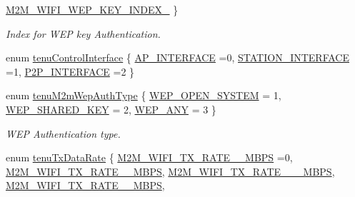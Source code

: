 \begin{DoxyCompactItemize}
\hyperlink{group__WlanEnums_gga43e100b0ae55a0b7000e5eaeaac24b8da59eea9302324b933e56fe7f408b89958}{M2\+M\+\_\+\+W\+I\+F\+I\+\_\+\+W\+E\+P\+\_\+\+K\+E\+Y\+\_\+\+I\+N\+D\+E\+X\+\_}
 \}\begin{DoxyCompactList}\small\item\em Index for W\+EP key Authentication. \end{DoxyCompactList}
\item 
enum \hyperlink{group__WlanEnums_ga21dc8518e48f99cdf9cf68eebcfcf982}{tenu\+Control\+Interface} \{ \hyperlink{group__WlanEnums_gga21dc8518e48f99cdf9cf68eebcfcf982aeef78d0be1ab7a519e48d25a2eea8717}{A\+P\+\_\+\+I\+N\+T\+E\+R\+F\+A\+CE} =0, 
\hyperlink{group__WlanEnums_gga21dc8518e48f99cdf9cf68eebcfcf982af1332c69b03c8077d76b6652e4b6b67d}{S\+T\+A\+T\+I\+O\+N\+\_\+\+I\+N\+T\+E\+R\+F\+A\+CE} =1, 
\hyperlink{group__WlanEnums_gga21dc8518e48f99cdf9cf68eebcfcf982a3a2237e45eb871715b30ac94c105b4a2}{P2\+P\+\_\+\+I\+N\+T\+E\+R\+F\+A\+CE} =2
 \}
\item 
enum \hyperlink{group__WlanEnums_gadb7d333125e6dcd9bf5e1c47f7d85c42}{tenu\+M2m\+Wep\+Auth\+Type} \{ \hyperlink{group__WlanEnums_ggadb7d333125e6dcd9bf5e1c47f7d85c42a486491e09ad6e120b316d488dbeadc76}{W\+E\+P\+\_\+\+O\+P\+E\+N\+\_\+\+S\+Y\+S\+T\+EM} = 1, 
\hyperlink{group__WlanEnums_ggadb7d333125e6dcd9bf5e1c47f7d85c42a499409188630862aa172dc8afab93606}{W\+E\+P\+\_\+\+S\+H\+A\+R\+E\+D\+\_\+\+K\+EY} = 2, 
\hyperlink{group__WlanEnums_ggadb7d333125e6dcd9bf5e1c47f7d85c42a604c4b6344620950733514c797ce4800}{W\+E\+P\+\_\+\+A\+NY} = 3
 \}\begin{DoxyCompactList}\small\item\em W\+EP Authentication type. \end{DoxyCompactList}
\item 
enum \hyperlink{group__WlanEnums_ga93cc7cca5e41a62c610de1e30ab38b96}{tenu\+Tx\+Data\+Rate} \{ \newline
\hyperlink{group__WlanEnums_gga93cc7cca5e41a62c610de1e30ab38b96a9fcec9f42e2161ab63459b6d7c241753}{M2\+M\+\_\+\+W\+I\+F\+I\+\_\+\+T\+X\+\_\+\+R\+A\+T\+E\+\_\+\_\+\+M\+B\+PS} =0, 
\hyperlink{group__WlanEnums_gga93cc7cca5e41a62c610de1e30ab38b96adbd7516ca787709ba452e6d840a5d46d}{M2\+M\+\_\+\+W\+I\+F\+I\+\_\+\+T\+X\+\_\+\+R\+A\+T\+E\+\_\+\_\+\+M\+B\+PS}, 
\hyperlink{group__WlanEnums_gga93cc7cca5e41a62c610de1e30ab38b96accafa7a04b93b791fa00ee7ed5837d26}{M2\+M\+\_\+\+W\+I\+F\+I\+\_\+\+T\+X\+\_\+\+R\+A\+T\+E\+\_\+\_\+\_\+\+M\+B\+PS}, 
\hyperlink{group__WlanEnums_gga93cc7cca5e41a62c610de1e30ab38b96a817dfc80a1fbae97d629bfa37b863642}{M2\+M\+\_\+\+W\+I\+F\+I\+\_\+\+T\+X\+\_\+\+R\+A\+T\+E\+\_\+\_\+\+M\+B\+PS}, 

\end{DoxyCompactItemize}
